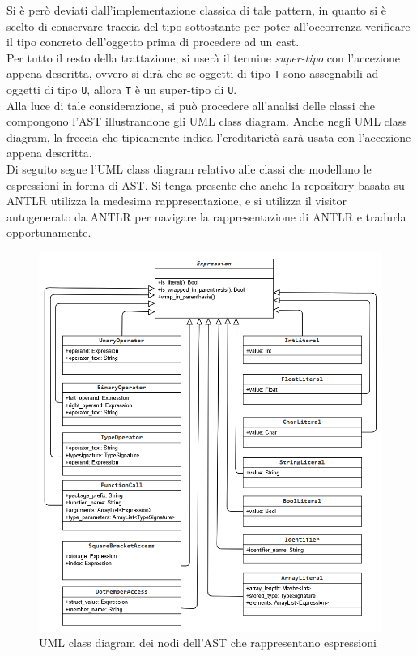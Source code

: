 Si è però deviati dall'implementazione classica di tale pattern, in quanto si è scelto di
conservare traccia del tipo sottostante per poter all'occorrenza verificare il tipo 
concreto dell'oggetto prima di procedere ad un cast. \\

Per tutto il resto della trattazione, si userà il termine \textit{super-tipo} con l'accezione 
appena descritta, ovvero si dirà che se oggetti di tipo \texttt{T} sono assegnabili 
ad oggetti di tipo \texttt{U}, allora \texttt{T} è un super-tipo di \texttt{U}. \\

Alla luce di tale considerazione, si può procedere all'analisi delle classi che
compongono l'AST illustrandone gli UML class diagram. Anche negli UML class diagram, 
la freccia che tipicamente indica l'ereditarietà sarà usata con l'accezione appena
descritta. \\

Di seguito segue l'UML class diagram relativo alle classi che modellano 
le espressioni in forma di AST. Si tenga presente che anche la repository
basata su ANTLR utilizza la medesima rappresentazione, e si utilizza il visitor 
autogenerato da ANTLR per navigare la rappresentazione di ANTLR e tradurla opportunamente.

\begin{figure}[H]
    \centering
        \includegraphics[width=1\textwidth]{../../Assets/AstExpr.png}
    \caption{UML class diagram dei nodi dell'AST che rappresentano espressioni}
\end{figure}

